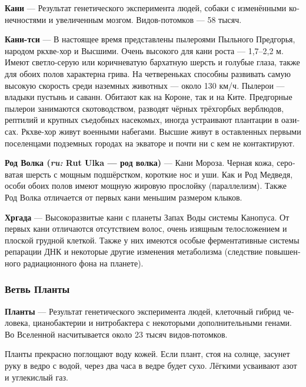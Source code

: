 \documentclass[a4paper,12pt,fleqn]{book}\usepackage{polyglossia}\setdefaultlanguage[babelshorthands=true]{russian}\setotherlanguage{english}\defaultfontfeatures{Ligatures=TeX,Mapping=tex-text}\usepackage{xcolor}\newcommand{\ml}[3]{#2}
\newcommand{\asterism}{\vspace{1em}{\centering\Large\bfseries$\ast~\ast~\ast$\par}\vspace{1em}}
\newcommand{\theterm}[3]{\textbf{\hypertarget{#1}{#2}} --- #3}
\newcommand{\theorigin}[3]{\textit{#1:} #2 --- #3}
\begin{document}
\theterm{kani-fork}
{Кани}
{Результат генетического эксперимента людей, собаки с изменёнными конечностями и увеличенным мозгом.
Видов-потомков --- 58 тысяч.}

\asterism

\theterm{qi-kani}
{Кани-тси}
{В настоящее время представлены пылероями Пыльного Предгорья, народом ркхве-хор и Высшими.
Очень высокого для кани роста --- 1,7--2,2 м.
Имеют светло-серую или коричневатую бархатную шерсть и голубые глаза, также для обоих полов характерна грива.
На четвереньках способны развивать самую высокую скорость среди наземных животных --- около 130 км/ч.
Пылерои --- владыки пустынь и саванн.
Обитают как на Короне, так и на Ките.
Предгорные пылерои занимаются скотоводством, разводят чёрных трёхгорбых верблюдов, рептилий и крупных съедобных насекомых, иногда устраивают плантации в оазисах.
Ркхве-хор живут военными набегами.
Высшие живут в оставленных первыми поселенцами подземных городах на экваторе и почти ни с кем не контактируют.}

\theterm{rut-ulka}
{Род Волка (\theorigin{ru}{Rut Ulka}{род волка})}
{Кани Мороза.
Черная кожа, сероватая шерсть с мощным подшёрстком, короткие нос и уши.
Как и Род Медведя, особи обоих полов имеют мощную жировую прослойку (параллелизм).
Также Род Волка отличается от первых кани меньшим размером клыков.}

\theterm{hrgadah}
{Хргада}
{Высокоразвитые кани с планеты Запах Воды системы Канопуса.
От первых кани отличаются отсутствием волос, очень изящным телосложением и плоской грудной клеткой.
Также у них имеются особые ферментативные системы репарации ДНК и некоторые другие изменения метаболизма (следствие повышенного радиационного фона на планете).}

\subsubsection{Ветвь Планты}

\theterm{plant-fork}
{Планты}
{Результат генетического эксперимента людей, клеточный гибрид человека, цианобактерии и нитробактера с некоторыми дополнительными генами.
Во Вселенной насчитывается около 23 тысяч видов-потомков.

Планты прекрасно поглощают воду кожей.
Если плант, стоя на солнце, засунет руку в ведро с водой, через два часа в ведре будет сухо.
Лёгкими усваивают азот и углекислый газ.}

\asterism
\end{document}
